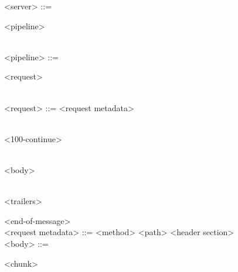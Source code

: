 \documentclass{article}
\begin{document}
\begin{syntdiag}
<server> ::= \begin{rep} <pipeline> \end{rep}
\\
<pipeline> ::= \begin{rep} <request> \end{rep}
\\
<request> ::= <request metadata> \begin{stack} \\ <100-continue> \end{stack} \begin{stack} \\ <body> \end{stack} \begin{stack} \\ <trailers> \end{stack} <end-of-message>
\\
<request metadata> ::= <method> <path> <header section>
\\
<body> ::= \begin{rep} <chunk> \end{rep}
\end{syntdiag}
\end{document}
